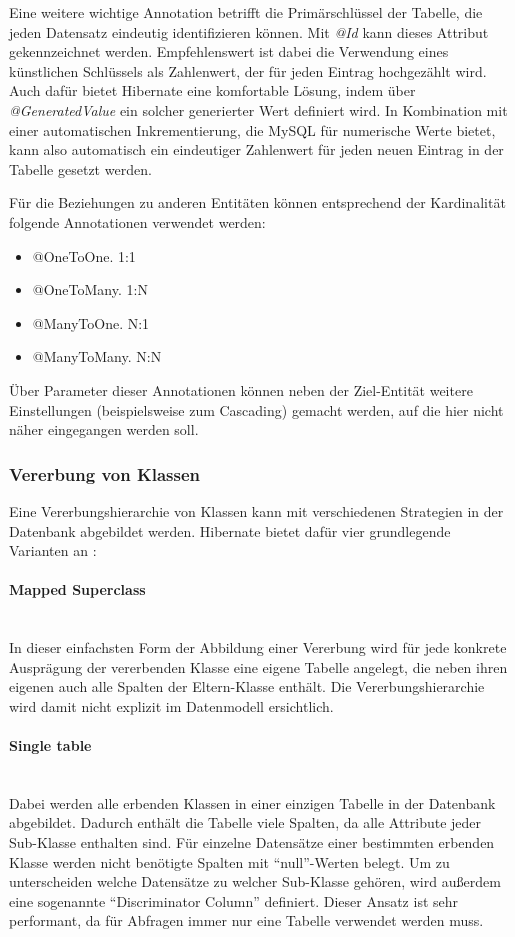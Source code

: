 Eine weitere wichtige Annotation betrifft die Primärschlüssel der Tabelle, die jeden Datensatz eindeutig identifizieren können. Mit \textit{@Id} kann dieses Attribut gekennzeichnet werden.
Empfehlenswert ist dabei die Verwendung eines künstlichen Schlüssels als Zahlenwert, der für jeden Eintrag hochgezählt wird.
Auch dafür bietet Hibernate eine komfortable Lösung, indem über \textit{@GeneratedValue} ein solcher generierter Wert definiert wird.
In Kombination mit einer automatischen Inkrementierung, die MySQL für numerische Werte bietet, kann also automatisch ein eindeutiger Zahlenwert für jeden neuen Eintrag in der Tabelle gesetzt werden.

Für die Beziehungen zu anderen Entitäten können entsprechend der Kardinalität folgende Annotationen verwendet werden:
\begin{itemize}
\item{@OneToOne.} 1:1
\item{@OneToMany.} 1:N
\item{@ManyToOne.} N:1
\item{@ManyToMany.} N:N
\end{itemize}

Über Parameter dieser Annotationen können neben der Ziel-Entität weitere Einstellungen (beispielsweise zum Cascading) gemacht werden, auf die hier nicht näher eingegangen werden soll.

\subsubsection{Vererbung von Klassen}
Eine Vererbungshierarchie von Klassen kann mit verschiedenen Strategien in der Datenbank abgebildet werden.
Hibernate bietet dafür vier grundlegende Varianten an \cite{Mihalcea2017}:
\paragraph{Mapped Superclass}$\;$ \\
In dieser einfachsten Form der Abbildung einer Vererbung wird für jede konkrete Ausprägung der vererbenden Klasse eine eigene Tabelle angelegt, die neben ihren eigenen auch alle Spalten der Eltern-Klasse enthält.
Die Vererbungshierarchie wird damit nicht explizit im Datenmodell ersichtlich.
\paragraph{Single table}$\;$ \\
Dabei werden alle erbenden Klassen in einer einzigen Tabelle in der Datenbank abgebildet. Dadurch enthält die Tabelle viele Spalten, da alle Attribute jeder Sub-Klasse enthalten sind.
Für einzelne Datensätze einer bestimmten erbenden Klasse werden nicht benötigte Spalten mit \enquote{null}-Werten belegt.
Um zu unterscheiden welche Datensätze zu welcher Sub-Klasse gehören, wird außerdem eine sogenannte \enquote{Discriminator Column} definiert.
Dieser Ansatz ist sehr performant, da für Abfragen immer nur eine Tabelle verwendet werden muss.

